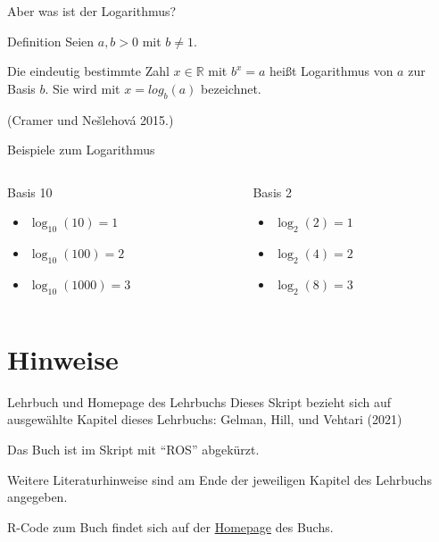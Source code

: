 \documentclass[
  ngerman,
  ignorenonframetext,
]{beamer}
\providecommand{\tightlist}{%
  \setlength{\itemsep}{0pt}\setlength{\parskip}{0pt}}
\begin{document}
\begin{frame}{Aber was ist der Logarithmus?}
\protect\hypertarget{aber-was-ist-der-logarithmus}{}
\begin{alertblock}{Definition}
Seien $a,b > 0$ mit $b \ne 1$.

Die eindeutig bestimmte Zahl $x \in \mathbb{R}$ 
 mit $b^x=a$ heißt Logarithmus von $a$ zur Basis $b$. Sie wird mit $x = log_b(a)$ bezeichnet.

\end{alertblock}

(Cramer und Nešlehová 2015.)
\end{frame}

\begin{frame}{Beispiele zum Logarithmus}
\protect\hypertarget{beispiele-zum-logarithmus}{}
\begin{columns}[T]
\begin{column}{0.48\textwidth}
\begin{block}{Basis 10}
\protect\hypertarget{basis-10}{}
\begin{itemize}
\tightlist
\item
  \(\log_{10}(10) = 1\)
\item
  \(\log_{10}(100) = 2\)
\item
  \(\log_{10}(1000) = 3\)
\end{itemize}
\end{block}
\end{column}

\begin{column}{0.48\textwidth}
\begin{block}{Basis 2}
\protect\hypertarget{basis-2}{}
\begin{itemize}
\tightlist
\item
  \(\log_{2}(2) = 1\)
\item
  \(\log_{2}(4) = 2\)
\item
  \(\log_{2}(8) = 3\)
\end{itemize}
\end{block}
\end{column}
\end{columns}
\end{frame}

\hypertarget{hinweise}{%
\section{Hinweise}\label{hinweise}}

\begin{frame}{Lehrbuch und Homepage des Lehrbuchs}
\protect\hypertarget{lehrbuch-und-homepage-des-lehrbuchs}{}
Dieses Skript bezieht sich auf ausgewählte Kapitel dieses Lehrbuchs:
Gelman, Hill, und Vehtari (2021)

Das Buch ist im Skript mit ``ROS'' abgekürzt.

Weitere Literaturhinweise sind am Ende der jeweiligen Kapitel des
Lehrbuchs angegeben.

R-Code zum Buch findet sich auf der
\href{https://avehtari.github.io/ROS-Examples/examples.html}{Homepage}
des Buchs.
\end{frame}
\end{document}
